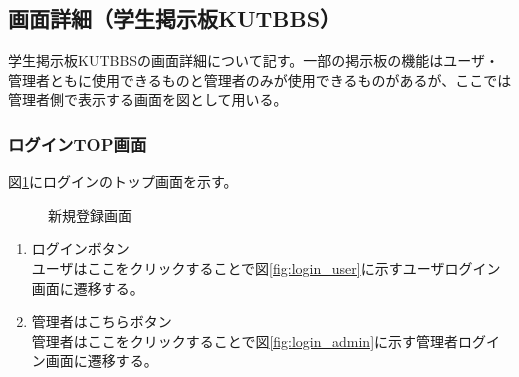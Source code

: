 \documentclass[a4j]{jarticle}
\begin{document}
\subsection{画面詳細（学生掲示板KUTBBS）}
学生掲示板KUTBBSの画面詳細について記す。一部の掲示板の機能はユーザ・管理者ともに使用できるものと管理者のみが使用できるものがあるが、ここでは管理者側で表示する画面を図として用いる。

\subsubsection{ログインTOP画面}
図\ref{fig:login_top}にログインのトップ画面を示す。
\begin{figure}[H]
\centering
{}
\caption{新規登録画面}
\label{fig:login_top}
\end{figure}
\begin{enumerate}
  \renewcommand{\labelenumi}{\textcircled{\scriptsize \theenumi}}

\item ログインボタン\\
ユーザはここをクリックすることで図\ref{fig:login_user}に示すユーザログイン画面に遷移する。
\item 管理者はこちらボタン\\
管理者はここをクリックすることで図\ref{fig:login_admin}に示す管理者ログイン画面に遷移する。
\end{enumerate}
\end{document}
